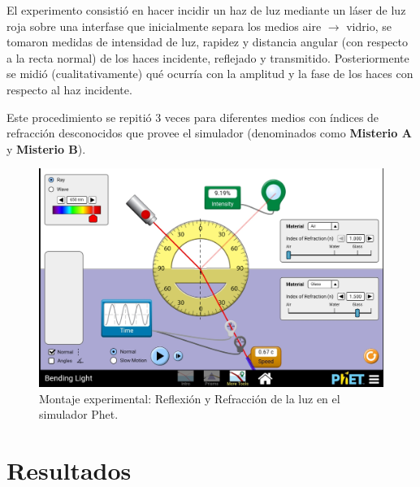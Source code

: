 \documentclass[
aps,
reprint,
amsmath, amssymb,
superscriptaddress,
]{revtex4-2}
\begin{document}
El experimento consistió en hacer incidir un haz de luz mediante un láser de luz roja sobre una interfase que inicialmente separa los medios aire $\rightarrow$ vidrio, se tomaron medidas de intensidad de luz, rapidez y distancia angular (con respecto a la recta normal) de los haces incidente, reflejado y transmitido. Posteriormente se midió (cualitativamente) qué ocurría con la amplitud y la fase de los haces con respecto al haz incidente. 

Este procedimiento se repitió 3 veces para diferentes medios con índices de refracción desconocidos que provee el simulador (denominados como \textbf{Misterio A} y \textbf{Misterio B}).

\begin{figure}
\centering
\includegraphics[width=\columnwidth]{img/montaje.jpg}
\caption{\label{fig:montaje} Montaje experimental: Reflexión y Refracción de la luz en el simulador Phet.}
\end{figure}

\section{\label{sec:resultados}Resultados}
\end{document}
